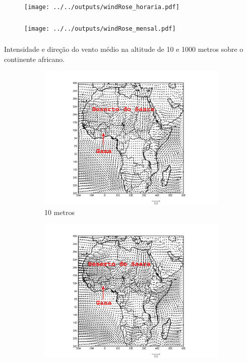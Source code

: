 \begin{frame}
	\frametitle{}
	\begin{figure}[H]
		\centering
		\texttt{[image: ../../outputs/windRose\_horaria.pdf]}
	\end{figure}
\end{frame}

\begin{frame}
	\frametitle{}
	\begin{figure}[H]
	\centering
		\texttt{[image: ../../outputs/windRose\_mensal.pdf]}
    \end{figure}
\end{frame}

\begin{frame}
\frametitle{}
Intensidade e direção do vento médio na altitude de 
10 e 1000 metros sobre o continente africano.
\begin{figure}[H]
\centering
  \begin{subfigure}[b]{0.5\linewidth}
    \includegraphics[width=\linewidth]{../../inputs/grads/gimp/1000hPa/JAN_2008.pdf}
    \caption{10 metros}
  \end{subfigure}%
  \begin{subfigure}[b]{0.5\linewidth}
    \includegraphics[width=\linewidth]{../../inputs/grads/gimp/875hPa/JAN_2008.pdf}

\end{subfigure}
\end{figure}
\end{frame}
